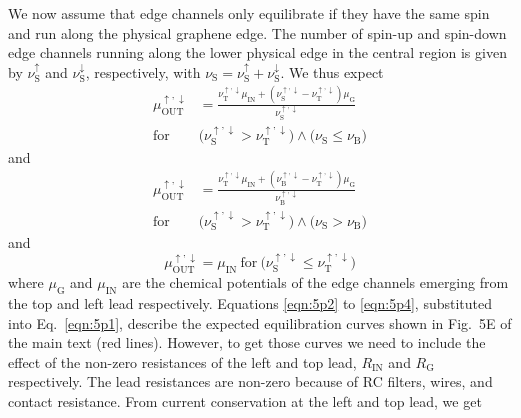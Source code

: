 \documentclass[%
reprint,amsmath,amssymb,aps,prl,superscriptaddress,
twocolumn
]{revtex4-1}
\begin{document}
		We now assume that edge channels only equilibrate if they have the same spin and run along the physical graphene edge. The number of spin-up and spin-down edge channels running along the lower physical edge in the central region is given by $\nu_\mathrm{S}^\uparrow$ and $\nu_\mathrm{S}^\downarrow$, respectively, with $\nu_\mathrm{S} = \nu_\mathrm{S}^\uparrow + \nu_\mathrm{S}^\downarrow$. We thus expect
		\begin{equation}
		\begin{split}
		\mu_\mathrm{OUT}^{\uparrow,\downarrow} & = \frac{\nu_\mathrm{T}^{\uparrow,\downarrow} \mu_\mathrm{IN}+ (\nu_\mathrm{S}^{\uparrow,\downarrow}-\nu_\mathrm{T}^{\uparrow,\downarrow}) \mu_\mathrm{G}} {\nu_\mathrm{S}^{\uparrow,\downarrow}} \\
		\mathrm{for} \ & \Big( \nu_\mathrm{S}^{\uparrow,\downarrow} > \nu_\mathrm{T}^{\uparrow,\downarrow} \Big) \wedge \Big(\nu_{\mathrm{S}} \leq \nu_\mathrm{B} \Big)
		\end{split}
		\label{eqn:5p2}
		\end{equation}
		and 
		\begin{equation}
		\begin{split}
		\mu_\mathrm{OUT}^{\uparrow,\downarrow} & = \frac{\nu_\mathrm{T}^{\uparrow,\downarrow} \mu_\mathrm{IN}+ (\nu_\mathrm{B}^{\uparrow,\downarrow}-\nu_\mathrm{T}^{\uparrow,\downarrow}) \mu_\mathrm{G}}{\nu_\mathrm{B}^{\uparrow,\downarrow}} \\
		\mathrm{for} \ & \Big( \nu_\mathrm{S}^{\uparrow,\downarrow} > \nu_\mathrm{T}^{\uparrow,\downarrow} \Big) \wedge \Big(\nu_\mathrm{S} > \nu_\mathrm{B} \Big)
		\end{split}
		\label{eqn:5p3}
		\end{equation}
		and 
		\begin{equation}
		\mu_\mathrm{OUT}^{\uparrow,\downarrow} = \mu_\mathrm{IN} \ \mathrm{for} \ \Big( \nu_\mathrm{S}^{\uparrow,\downarrow} \leq \nu_\mathrm{T}^{\uparrow,\downarrow} \Big) 
		\label{eqn:5p4}
		\end{equation}
		where $\mu_\mathrm{G}$ and $\mu_\mathrm{IN}$ are the chemical potentials of the edge channels emerging from the top and left lead respectively. Equations \ref{eqn:5p2} to \ref{eqn:5p4}, substituted into Eq.~\ref{eqn:5p1}, describe the expected equilibration curves shown in Fig.~5E of the main text (red lines). However, to get those curves we need to include the effect of the non-zero resistances of the left and top lead, $R_\mathrm{IN}$ and $R_\mathrm{G}$ respectively. 
		The lead resistances are non-zero because of RC filters, wires, and contact resistance. From current conservation at the left and top lead, we get 
\end{document}
